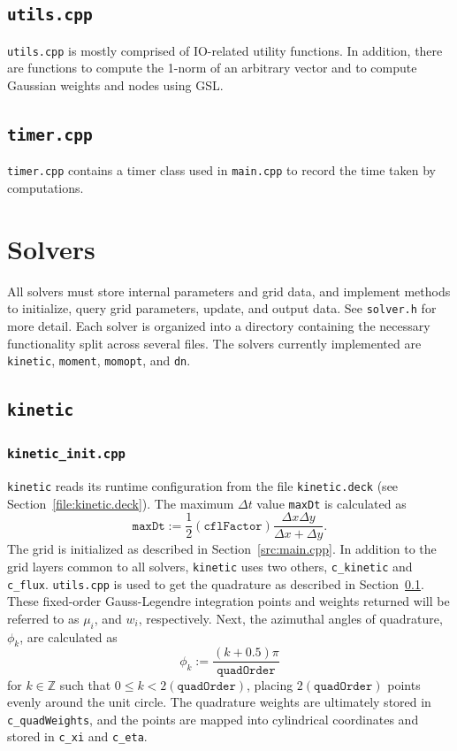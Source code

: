 \documentclass{article}
\newcommand{\main}{\texttt{main.cpp}\xspace}
\newcommand{\utils}{\texttt{utils.cpp}\xspace}
\newcommand{\timer}{\texttt{timer.cpp}\xspace}
\newcommand{\kineticdeck}{\texttt{kinetic.deck}\xspace}
\newcommand{\quadorder}{\ensuremath{\mathtt{quadOrder}}\xspace}
\newcommand{\dn}{\texttt{dn}\xspace}
\newcommand{\Z}{\ensuremath{\mathbb{Z}}\xspace}
\newcommand{\assign}{\ensuremath{\mathrel{\texttt{:=}}}}
\newcommand{\kinetic}{\texttt{kinetic}\xspace}
\newcommand{\moment}{\texttt{moment}\xspace}
\newcommand{\momopt}{\texttt{momopt}\xspace}
\begin{document}
\subsection{\utils}
\label{src:utils.cpp}
\utils is mostly comprised of IO-related utility functions. In addition, there are
functions to compute the 1-norm of an arbitrary vector and to compute Gaussian weights and nodes using GSL.

\subsection{\timer}
\label{src:timer.cpp}
\timer contains a timer class used in \main to record the time taken by computations.

\section{Solvers}
\label{solver}
All solvers must store internal parameters and grid data, and implement methods to
initialize, query grid parameters, update, and output data. See \texttt{solver.h}
for more detail. Each solver is organized into a directory containing the necessary
functionality split across several files. The solvers currently implemented
are \kinetic, \moment, \momopt, and \dn.

\subsection{\kinetic}
\label{solver:kinetic}
\subsubsection{\texttt{kinetic\_init.cpp}}
\label{src:kinetic_init.cpp}
\kinetic reads its runtime configuration from the file \kineticdeck
(see Section~\ref{file:kinetic.deck}). The maximum $\Delta t$ value \texttt{maxDt}
is calculated as
\begin{equation} %
    \mathtt{maxDt} \assign \frac{1}{2} (\mathtt{cflFactor})
        \frac{\Delta x \Delta y}{\Delta x + \Delta y}.
\end{equation}
The grid is initialized as described in Section~\ref{src:main.cpp}. In addition to
the grid layers common to all solvers, \kinetic uses two others, \texttt{c\_kinetic}
and \texttt{c\_flux}. \utils is used
to get the quadrature as described in Section~\ref{src:utils.cpp}. These fixed-order
Gauss-Legendre integration points and weights returned will be referred to as $\mu_i$,
and $w_i$, respectively. Next, the
azimuthal angles of quadrature, $\phi_k$, are calculated as
\begin{equation}
    \phi_k \assign \frac{(k + 0.5)\pi}{\quadorder}
\end{equation}
for $k \in \Z$ such that $0 \leq k < 2(\quadorder)$,
placing $2(\quadorder)$ points evenly around the unit circle.
The quadrature weights are ultimately stored in
\texttt{c\_quadWeights}, and the points are mapped into cylindrical coordinates
and stored in \texttt{c\_xi} and \texttt{c\_eta}.
\end{document}
